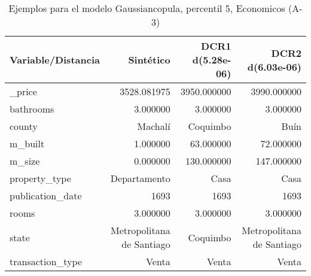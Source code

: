 \begin{table}[H]
\centering
\fontsize{10}{14}\selectfont
\caption{Ejemplos para el modelo Gaussiancopula, percentil 5, Economicos (A-3)}
\label{table-example-economicos-a-3-gaussiancopula-5p}
\begin{tabular}{|l|r|r|r|}
\hline
\rowcolor[gray]{0.8}
Variable/Distancia & Sintético & DCR1 d(5.28e-06) & DCR2 d(6.03e-06) \\
\hline \_price & \cellcolor[rgb]{0.9, 0.54, 0.52} 3528.081975 & 3950.000000 & 3990.000000 \\
\hline bathrooms & \cellcolor[rgb]{0.9, 0.54, 0.52} 3.000000 & \cellcolor[rgb]{0.9, 0.54, 0.52} 3.000000 & \cellcolor[rgb]{0.9, 0.54, 0.52} 3.000000 \\
\hline county & \cellcolor[rgb]{0.9, 0.54, 0.52} Machalí & Coquimbo & Buín \\
\hline m\_built & \cellcolor[rgb]{0.9, 0.54, 0.52} 1.000000 & 63.000000 & 72.000000 \\
\hline m\_size & \cellcolor[rgb]{0.9, 0.54, 0.52} 0.000000 & 130.000000 & 147.000000 \\
\hline property\_type & \cellcolor[rgb]{0.9, 0.54, 0.52} Departamento & Casa & Casa \\
\hline publication\_date & \cellcolor[rgb]{0.9, 0.54, 0.52} 1693 & \cellcolor[rgb]{0.9, 0.54, 0.52} 1693 & \cellcolor[rgb]{0.9, 0.54, 0.52} 1693 \\
\hline rooms & \cellcolor[rgb]{0.9, 0.54, 0.52} 3.000000 & \cellcolor[rgb]{0.9, 0.54, 0.52} 3.000000 & \cellcolor[rgb]{0.9, 0.54, 0.52} 3.000000 \\
\hline state & \cellcolor[rgb]{0.9, 0.54, 0.52} Metropolitana de Santiago & Coquimbo & \cellcolor[rgb]{0.9, 0.54, 0.52} Metropolitana de Santiago \\
\hline transaction\_type & \cellcolor[rgb]{0.9, 0.54, 0.52} Venta & \cellcolor[rgb]{0.9, 0.54, 0.52} Venta & \cellcolor[rgb]{0.9, 0.54, 0.52} Venta \\
\hline
\end{tabular}
\end{table}
